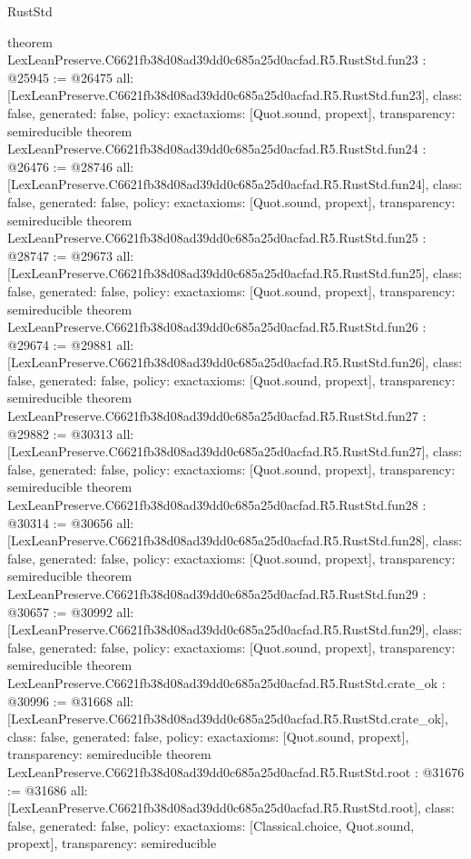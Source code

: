 \begin{lexlean}{RustStd}
\begin{coremodule}
{}
theorem LexLeanPreserve.C6621fb38d08ad39dd0c685a25d0acfad.R5.RustStd.fun23 : @25945 := @26475 {
  all: [LexLeanPreserve.C6621fb38d08ad39dd0c685a25d0acfad.R5.RustStd.fun23],
  class: false,
  generated: false,
  policy: exact{axioms: [Quot.sound, propext]},
  transparency: semireducible
}
theorem LexLeanPreserve.C6621fb38d08ad39dd0c685a25d0acfad.R5.RustStd.fun24 : @26476 := @28746 {
  all: [LexLeanPreserve.C6621fb38d08ad39dd0c685a25d0acfad.R5.RustStd.fun24],
  class: false,
  generated: false,
  policy: exact{axioms: [Quot.sound, propext]},
  transparency: semireducible
}
theorem LexLeanPreserve.C6621fb38d08ad39dd0c685a25d0acfad.R5.RustStd.fun25 : @28747 := @29673 {
  all: [LexLeanPreserve.C6621fb38d08ad39dd0c685a25d0acfad.R5.RustStd.fun25],
  class: false,
  generated: false,
  policy: exact{axioms: [Quot.sound, propext]},
  transparency: semireducible
}
theorem LexLeanPreserve.C6621fb38d08ad39dd0c685a25d0acfad.R5.RustStd.fun26 : @29674 := @29881 {
  all: [LexLeanPreserve.C6621fb38d08ad39dd0c685a25d0acfad.R5.RustStd.fun26],
  class: false,
  generated: false,
  policy: exact{axioms: [Quot.sound, propext]},
  transparency: semireducible
}
theorem LexLeanPreserve.C6621fb38d08ad39dd0c685a25d0acfad.R5.RustStd.fun27 : @29882 := @30313 {
  all: [LexLeanPreserve.C6621fb38d08ad39dd0c685a25d0acfad.R5.RustStd.fun27],
  class: false,
  generated: false,
  policy: exact{axioms: [Quot.sound, propext]},
  transparency: semireducible
}
theorem LexLeanPreserve.C6621fb38d08ad39dd0c685a25d0acfad.R5.RustStd.fun28 : @30314 := @30656 {
  all: [LexLeanPreserve.C6621fb38d08ad39dd0c685a25d0acfad.R5.RustStd.fun28],
  class: false,
  generated: false,
  policy: exact{axioms: [Quot.sound, propext]},
  transparency: semireducible
}
theorem LexLeanPreserve.C6621fb38d08ad39dd0c685a25d0acfad.R5.RustStd.fun29 : @30657 := @30992 {
  all: [LexLeanPreserve.C6621fb38d08ad39dd0c685a25d0acfad.R5.RustStd.fun29],
  class: false,
  generated: false,
  policy: exact{axioms: [Quot.sound, propext]},
  transparency: semireducible
}
theorem LexLeanPreserve.C6621fb38d08ad39dd0c685a25d0acfad.R5.RustStd.crate_ok : @30996 := @31668 {
  all: [LexLeanPreserve.C6621fb38d08ad39dd0c685a25d0acfad.R5.RustStd.crate_ok],
  class: false,
  generated: false,
  policy: exact{axioms: [Quot.sound, propext]},
  transparency: semireducible
}
theorem LexLeanPreserve.C6621fb38d08ad39dd0c685a25d0acfad.R5.RustStd.root : @31676 := @31686 {
  all: [LexLeanPreserve.C6621fb38d08ad39dd0c685a25d0acfad.R5.RustStd.root],
  class: false,
  generated: false,
  policy: exact{axioms: [Classical.choice, Quot.sound, propext]},
  transparency: semireducible
}


\end{coremodule}
\end{lexlean}
